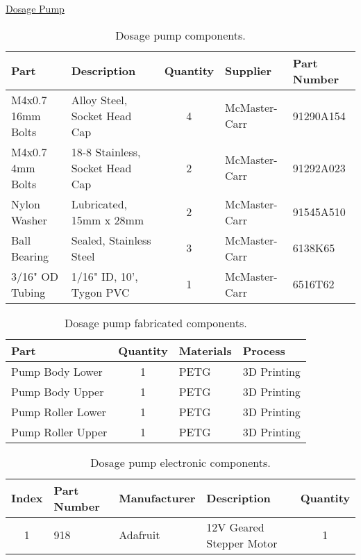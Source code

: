 \uline{Dosage Pump}
\begin{table}[!ht]
    \centering
    \begin{tabular}{|l|l|c|l|l|}
    \hline
        Part                & Description                       & Quantity  & Supplier      & Part Number   \\ \hline
        M4x0.7 16mm Bolts   & Alloy Steel, Socket Head Cap      & 4         & McMaster-Carr & 91290A154     \\ \hline
        M4x0.7 4mm Bolts    & 18-8 Stainless, Socket Head Cap   & 2         & McMaster-Carr & 91292A023     \\ \hline
        Nylon Washer        & Lubricated, 15mm x 28mm           & 2         & McMaster-Carr & 91545A510     \\ \hline
        Ball Bearing        & Sealed, Stainless Steel           & 3         & McMaster-Carr & 6138K65       \\ \hline
        3/16" OD Tubing     & 1/16" ID, 10', Tygon PVC          & 1         & McMaster-Carr & 6516T62       \\ \hline
    \end{tabular}
    \caption{Dosage pump components.}
    \label{tab:aeroponics_dosagepump_parts}
\end{table}

\begin{table}[!ht]
    \centering
    \begin{tabular}{|l|c|l|l|}
    \hline
        Part                & Quantity  & Materials & Process       \\ \hline
        Pump Body Lower     & 1         & PETG      & 3D Printing   \\ \hline
        Pump Body Upper     & 1         & PETG      & 3D Printing   \\ \hline
        Pump Roller Lower   & 1         & PETG      & 3D Printing   \\ \hline
        Pump Roller Upper   & 1         & PETG      & 3D Printing   \\ \hline
    \end{tabular}
    \caption{Dosage pump fabricated components.}
    \label{tab:aeroponics_dosagepump_fabrication}
\end{table}

\begin{table}[!ht]
    \centering
    \begin{tabular}{|c|l|l|l|c|}
    \hline
        Index   & Part Number   & Manufacturer  & Description               & Quantity  \\ \hline
        1       & 918           & Adafruit      & 12V Geared Stepper Motor  & 1         \\ \hline
    \end{tabular}
    \caption{Dosage pump electronic components.}
    \label{tab:aeroponics_dosagepump_components}
\end{table}

